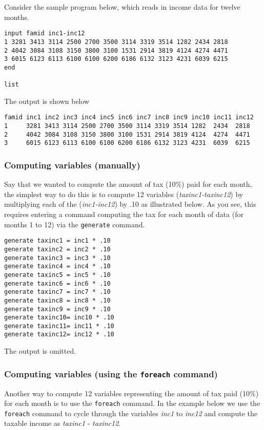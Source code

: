 Consider the sample program below, which reads in income data for twelve months.

\begin{lstlisting}
input famid inc1-inc12
1 3281 3413 3114 2500 2700 3500 3114 3319 3514 1282 2434 2818
2 4042 3084 3108 3150 3800 3100 1531 2914 3819 4124 4274 4471
3 6015 6123 6113 6100 6100 6200 6186 6132 3123 4231 6039 6215
end

list
\end{lstlisting}

The output is shown below

\begin{lstlisting}
famid inc1 inc2 inc3 inc4 inc5 inc6 inc7 inc8 inc9 inc10 inc11 inc12
1     3281 3413 3114 2500 2700 3500 3114 3319 3514 1282  2434  2818
2     4042 3084 3108 3150 3800 3100 1531 2914 3819 4124  4274  4471
3     6015 6123 6113 6100 6100 6200 6186 6132 3123 4231  6039  6215
\end{lstlisting}

\subsubsection{Computing variables (manually)}

Say that we wanted to compute the amount of tax (10\%) paid for each month, the simplest way to do this is to compute 12 variables (\textit{taxinc1-taxinc12}) by multiplying each of the (\textit{inc1-inc12}) by .10 as illustrated below.  As you see, this requires entering a command computing the tax for each month of data (for months 1 to 12) via the \lstinline{generate} command.

\begin{lstlisting}
generate taxinc1 = inc1 * .10
generate taxinc2 = inc2 * .10
generate taxinc3 = inc3 * .10
generate taxinc4 = inc4 * .10
generate taxinc5 = inc5 * .10
generate taxinc6 = inc6 * .10
generate taxinc7 = inc7 * .10
generate taxinc8 = inc8 * .10
generate taxinc9 = inc9 * .10
generate taxinc10= inc10 * .10
generate taxinc11= inc11 * .10
generate taxinc12= inc12 * .10
\end{lstlisting}

The output is omitted.

\subsubsection{Computing variables (using the \lstinline{foreach} command)}

Another way to compute 12 variables representing the amount of tax paid (10\%) for each month is to use the \lstinline{foreach} command.  In the example below we use the \lstinline{foreach} command to cycle through the variables \textit{inc1} to \textit{inc12} and compute the taxable income as \textit{taxinc1} - \textit{taxinc12}.

